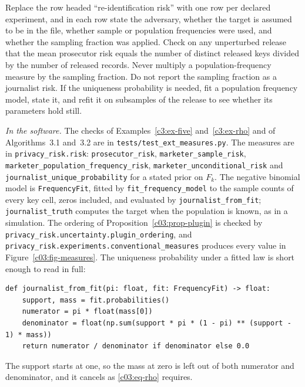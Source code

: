 \begin{inpractice}\sloppy
Replace the row headed ``re-identification risk'' with one row per declared experiment,
and in each row state the adversary, whether the target is assumed to be in the file,
whether sample or population frequencies were used, and whether the sampling fraction
was applied. Check on any unperturbed release that the mean prosecutor risk equals the
number of distinct released keys divided by the number of released records. Never
multiply a population-frequency measure by the sampling fraction. Do not report the
sampling fraction as a journalist risk. If the uniqueness probability is needed, fit a
population frequency model, state it, and refit it on subsamples of the release to see
whether its parameters hold still.

\smallskip\noindent\textit{In the software.} The checks of Examples~\ref{c3:ex-five} and~\ref{c3:ex-rho} and of Algorithms~3.1 and~3.2 are in \texttt{tests/test\_ext\_measures.py}. The measures are in
\texttt{privacy\_risk.risk}: \texttt{prosecutor\_risk}, \texttt{marketer\_sample\_risk},
\texttt{marketer\_population\_frequency\_risk}, \texttt{marketer\_unconditional\_risk}
and \texttt{journalist\_unique\_probability} for a stated prior on $F_k$. The negative
binomial model is \texttt{FrequencyFit}, fitted by \texttt{fit\_frequency\_model} to the
sample counts of every key cell, zeros included, and evaluated by
\texttt{journalist\_from\_fit}; \texttt{journalist\_truth} computes the target when the
population is known, as in a simulation. The ordering of
Proposition~\ref{c03:prop-plugin} is checked by
\texttt{privacy\_risk.uncertainty.plugin\_ordering}, and
\texttt{privacy\_risk.experiments.conventional\_measures} produces every value in
Figure~\ref{c03:fig-measures}. The uniqueness probability under a fitted law is short
enough to read in full:
\begin{lstlisting}
def journalist_from_fit(pi: float, fit: FrequencyFit) -> float:
    support, mass = fit.probabilities()
    numerator = pi * float(mass[0])
    denominator = float(np.sum(support * pi * (1 - pi) ** (support - 1) * mass))
    return numerator / denominator if denominator else 0.0
\end{lstlisting}
The support starts at one, so the mass at zero is left out of both numerator and
denominator, and it cancels as \eqref{c03:eq-rho} requires.
\end{inpractice}

